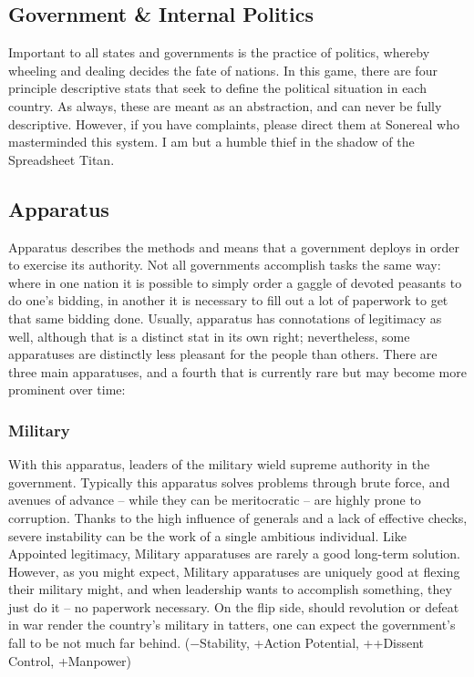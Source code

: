\documentclass[11 pt]{scrartcl}
\begin{document}
\subsection{Government \& Internal Politics}

Important to all states and governments is the practice of politics, whereby wheeling and dealing decides the fate of nations. In this game, there are four principle descriptive stats that seek to define the political situation in each country. As always, these are meant as an abstraction, and can never be fully descriptive. However, if you have complaints, please direct them at Sonereal who masterminded this system. I am but a humble thief in the shadow of the Spreadsheet Titan.

\subsection{Apparatus}

Apparatus describes the methods and means that a government deploys in order to exercise its authority. Not all governments accomplish tasks the same way: where in one nation it is possible to simply order a gaggle of devoted peasants to do one’s bidding, in another it is necessary to fill out a lot of paperwork to get that same bidding done. Usually, apparatus has connotations of legitimacy as well, although that is a distinct stat in its own right; nevertheless, some apparatuses are distinctly less pleasant for the people than others. There are three main apparatuses, and a fourth that is currently rare but may become more prominent over time:

\subsubsection*{Military} 

With this apparatus, leaders of the military wield supreme authority in the government. Typically this apparatus solves problems through brute force, and avenues of advance – while they can be meritocratic – are highly prone to corruption. Thanks to the high influence of generals and a lack of effective checks, severe instability can be the work of a single ambitious individual. Like Appointed legitimacy, Military apparatuses are rarely a good long-term solution. However, as you might expect, Military apparatuses are uniquely good at flexing their military might, and when leadership wants to accomplish something, they just do it – no paperwork necessary. On the flip side, should revolution or defeat in war render the country’s military in tatters, one can expect the government’s fall to be not much far behind. ($-$Stability, +Action Potential, ++Dissent Control, +Manpower)
\end{document}
